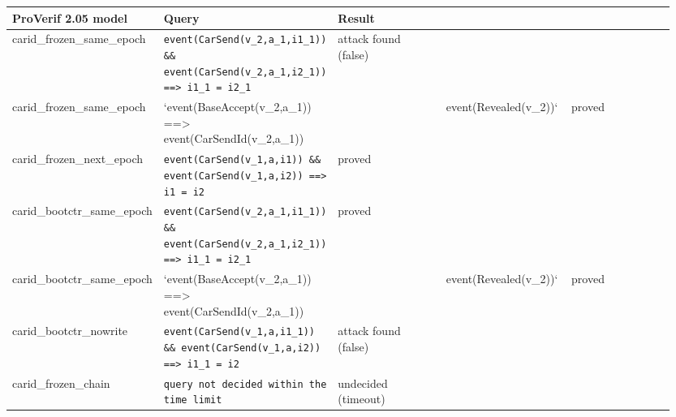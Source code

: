 {\scriptsize\raggedright
\begin{longtable}{p{0.190\linewidth}p{0.190\linewidth}p{0.190\linewidth}p{0.190\linewidth}p{0.190\linewidth}}
\toprule
ProVerif 2.05 model & Query & Result &  &  \\
\midrule
\endhead
carid\_frozen\_same\_epoch & \texttt{event(CarSend(v\_2,a\_1,i1\_1)) \&\& event(CarSend(v\_2,a\_1,i2\_1)) ==> i1\_1 = i2\_1} & attack found (false) &  &  \\
carid\_frozen\_same\_epoch & `event(BaseAccept(v\_2,a\_1)) ==> event(CarSendId(v\_2,a\_1)) &  & event(Revealed(v\_2))` & proved \\
carid\_frozen\_next\_epoch & \texttt{event(CarSend(v\_1,a,i1)) \&\& event(CarSend(v\_1,a,i2)) ==> i1 = i2} & proved &  &  \\
carid\_bootctr\_same\_epoch & \texttt{event(CarSend(v\_2,a\_1,i1\_1)) \&\& event(CarSend(v\_2,a\_1,i2\_1)) ==> i1\_1 = i2\_1} & proved &  &  \\
carid\_bootctr\_same\_epoch & `event(BaseAccept(v\_2,a\_1)) ==> event(CarSendId(v\_2,a\_1)) &  & event(Revealed(v\_2))` & proved \\
carid\_bootctr\_nowrite & \texttt{event(CarSend(v\_1,a,i1\_1)) \&\& event(CarSend(v\_1,a,i2)) ==> i1\_1 = i2} & attack found (false) &  &  \\
carid\_frozen\_chain & \texttt{query not decided within the time limit} & undecided (timeout) &  &  \\
\bottomrule
\end{longtable}}

